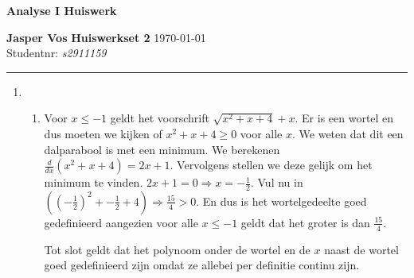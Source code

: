 \documentclass{article}
\begin{document}
{\Large \textbf{Analyse I Huiswerk}}

\bigskip

\textbf{Jasper Vos} \hfill \textbf{Huiswerkset 2} \hfill \today \\
Studentnr: \emph{s2911159} 

\rule{\textwidth}{2pt}

\bigskip

\begin{enumerate}
    \item
    \begin{enumerate}[label=\alph*)]
        \item
            Voor $x \leq -1$ geldt het voorschrift $\sqrt{x^2 + x + 4} + x$.
            Er is een wortel en dus moeten we kijken of $x^2 + x + 4 \geq 0$ voor alle $x$.
            We weten dat dit een dalparabool is met een minimum. We berekenen $\frac{d}{dx}(x^2 + x + 4) = 2x + 1$. Vervolgens stellen we deze gelijk om het minimum te vinden.
            $2x + 1 = 0 \Rightarrow x = -\frac{1}{2}$. Vul nu in $((-\frac{1}{2})^2 + -\frac{1}{2} + 4) \Rightarrow \frac{15}{4} > 0$. En dus is het wortelgedeelte goed gedefinieerd aangezien voor alle $x \leq -1$ geldt dat het groter is dan $\frac{15}{4}$.  
            
            Tot slot geldt dat het polynoom onder de wortel en de $x$ naast de wortel goed gedefinieerd zijn omdat ze allebei per definitie continu zijn.


\end{enumerate}
\end{enumerate}
\end{document}
